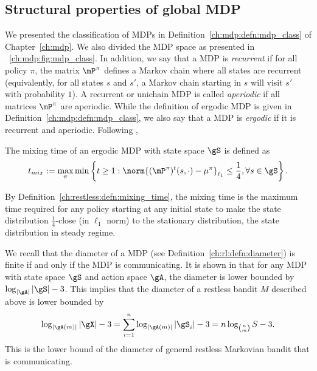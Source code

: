 
\subsection{Structural properties of global MDP}
\label{ssec:mdp_params}

We presented the classification of MDPs in Definition~\ref{ch:mdp:defn:mdp_class} of Chapter~\ref{ch:mdp}.
We also divided the MDP space as presented in \figurename~\ref{ch:mdp:fig:mdp_class}.
In addition, we say that a MDP is \emph{recurrent} if for all policy $\pi$, the matrix $\mP^\pi$ defines a Markov chain where all states are recurrent (equivalently, for all states $s$ and $s'$, a Markov chain starting in $s$ will visit $s'$ with probability $1$).
A recurrent or unichain MDP is called \emph{aperiodic} if all matrices $\mP^\pi$ are aperiodic.
While the definition of ergodic MDP is given in Definition~\ref{ch:mdp:defn:mdp_class}, we also say that a MDP is \emph{ergodic} if it is recurrent and aperiodic.
Following \cite[Definition 5.1]{wei2020model},
\begin{defn}
    \label{ch:restless:defn:mixing_time}
    The mixing time of an ergodic MDP with state space $\gS$ is defined as
    \begin{align*}
        t_{mix} := \max_{\pi}\min\left\{ t\ge1 : \norm{(\mP^\pi)^t(s,\cdot) - \mu^\pi}_{\ell_1} \le \frac14, \forall s\in\gS\right\}.
    \end{align*}
\end{defn}
By Definition~\ref{ch:restless:defn:mixing_time}, the mixing time is the maximum time required for any policy starting at any initial state to make the state distribution $\frac14$-close (in $\ell_1$ norm) to the stationary distribution, the state distribution in steady regime.

We recall that the diameter of a MDP (see Definition~\ref{ch:rl:defn:diameter}) is finite if and only if the MDP is communicating.
It is shown in \cite[Appendix A]{jaksch2010near} that for any MDP with state space $\gS$ and action space $\gA$, the diameter is lower bounded by $\log_{|\gA|}|\gS|-3$.
This implies that the diameter of a restless bandit $M$ described above is lower bounded by %
\begin{equation*}
    \log_{|\gA(m)|}|\gX| -3 = \sum_{i=1}^{n}\log_{|\gA(m)|}|\gS_i| -3 =n\log_{{n \choose m}}S -3.
\end{equation*}
This is the lower bound of the diameter of general restless Markovian bandit that is communicating.


